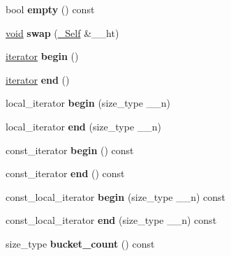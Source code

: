 \begin{DoxyCompactItemize}
\item 
\mbox{\label{classhashtable_a7c682967726ae9d11ddb30f476daa7dd}} 
bool {\bfseries empty} () const
\item 
\mbox{\label{classhashtable_ab73a15778f2fbc33d6e2d47579184be3}} 
\hyperlink{interfacevoid}{void} {\bfseries swap} (\hyperlink{classhashtable}{\+\_\+\+Self} \&\+\_\+\+\_\+ht)
\item 
\mbox{\label{classhashtable_ace3659f5a29b5abbeead961f612563f0}} 
\hyperlink{structiterator}{iterator} {\bfseries begin} ()
\item 
\mbox{\label{classhashtable_a64bdf03e3603bb6eee9efce674181551}} 
\hyperlink{structiterator}{iterator} {\bfseries end} ()
\item 
\mbox{\label{classhashtable_a0883733b4a6d726b45fd46ad4bd3220d}} 
local\+\_\+iterator {\bfseries begin} (size\+\_\+type \+\_\+\+\_\+n)
\item 
\mbox{\label{classhashtable_a4ca2e142f5c179e68280932e5a12f6b4}} 
local\+\_\+iterator {\bfseries end} (size\+\_\+type \+\_\+\+\_\+n)
\item 
\mbox{\label{classhashtable_a5be315ba535c6de11db51430e6ad6438}} 
const\+\_\+iterator {\bfseries begin} () const
\item 
\mbox{\label{classhashtable_ab512801a294cadc9c1ded6f6f2b2af9c}} 
const\+\_\+iterator {\bfseries end} () const
\item 
\mbox{\label{classhashtable_a1a6f8cabb0f91889e8e095913348b8dd}} 
const\+\_\+local\+\_\+iterator {\bfseries begin} (size\+\_\+type \+\_\+\+\_\+n) const
\item 
\mbox{\label{classhashtable_ac868c2ca569627372817ec2f261df4a9}} 
const\+\_\+local\+\_\+iterator {\bfseries end} (size\+\_\+type \+\_\+\+\_\+n) const
\item 
\mbox{\label{classhashtable_a849f4d224a597465337740065a151259}} 
size\+\_\+type {\bfseries bucket\+\_\+count} () const

\end{DoxyCompactItemize}
